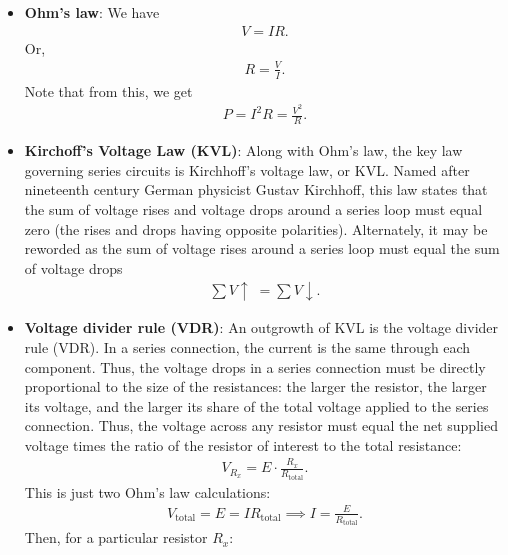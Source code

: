 \documentclass{report}
\begin{document}
\begin{itemize}
\begin{align*}
                \text{Effect} = \frac{\text{cause}}{\text{opposition}}
            .\end{align*}
        \item \textbf{Ohm's law}: We have
            \begin{align*}
                V = IR
            .\end{align*}
            Or,
            \begin{align*}
                R = \frac{V}{I}
            .\end{align*}
            Note that from this, we get
            \begin{align*}
                P = I^{2}R = \frac{V^{2}}{R}
            .\end{align*}
        \item \textbf{Kirchoff's Voltage Law (KVL)}: Along with Ohm's law, the key law governing series circuits is Kirchhoff's voltage law, or KVL. Named after nineteenth century German physicist Gustav Kirchhoff, this law states that the sum of voltage rises and voltage drops around a series loop must equal zero (the rises and drops having opposite polarities). Alternately, it may be reworded as the sum of voltage rises around a series loop must equal the sum of voltage drops
            \begin{align*}
                \sum V \uparrow\; = \sum V \downarrow
            .\end{align*}
        \item \textbf{Voltage divider rule (VDR)}: An outgrowth of KVL is the voltage divider rule (VDR). In a series connection, the current is the same through each component. Thus, the voltage drops in a series connection must be directly proportional to the size of the resistances: the larger the resistor, the larger its voltage, and the larger its share of the total voltage applied to the series connection. Thus, the voltage across any resistor must equal the net supplied voltage times the ratio of the resistor of interest to the total resistance:
            \begin{align*}
                V_{R_{x}} = E \cdot \frac{R_{x}}{R_{\text{total}}}
            .\end{align*}
            This is just two Ohm's law calculations:
            \begin{align*}
                V_{\text{total}} = E = IR_{\text{total}} \implies I = \frac{E}{R_{\text{total}}}
            .\end{align*}
            Then, for a particular resistor $R_{x}$:

\end{itemize}
\end{document}
